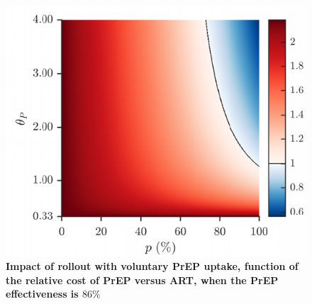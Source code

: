 \documentclass[12pt]{article}
\begin{document}
\newpage
\begin{figure}[H]	
\small	
\centering		
\includegraphics{Figures/Fig_S4}	
\caption[Impact of rollout with voluntary PrEP uptake, function of the relative cost of PrEP versus ART, when the PrEP effectiveness is $86\%$]{%
	{\bf {} Impact of rollout with voluntary PrEP uptake, function of the relative cost of PrEP versus ART, when the PrEP effectiveness is $86\%$}\\
}
\end{figure}
\end{document}
